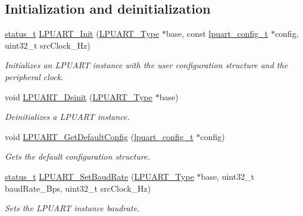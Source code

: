 \subsection*{Initialization and deinitialization}
\begin{DoxyCompactItemize}
\item 
\mbox{\hyperlink{group__ksdk__common_gaaabdaf7ee58ca7269bd4bf24efcde092}{status\+\_\+t}} \mbox{\hyperlink{group__lpuart__driver_ga26ce3e5d63d8dd5d317a83f22af9682c}{L\+P\+U\+A\+R\+T\+\_\+\+Init}} (\mbox{\hyperlink{struct_l_p_u_a_r_t___type}{L\+P\+U\+A\+R\+T\+\_\+\+Type}} $\ast$base, const \mbox{\hyperlink{group__lpuart__driver_ga35757fcc752984cb90dafc2e815c3d05}{lpuart\+\_\+config\+\_\+t}} $\ast$config, uint32\+\_\+t src\+Clock\+\_\+\+Hz)
\begin{DoxyCompactList}\small\item\em Initializes an L\+P\+U\+A\+RT instance with the user configuration structure and the peripheral clock. \end{DoxyCompactList}\item 
void \mbox{\hyperlink{group__lpuart__driver_ga303ff3b77767bafa449d96f1e8c921e0}{L\+P\+U\+A\+R\+T\+\_\+\+Deinit}} (\mbox{\hyperlink{struct_l_p_u_a_r_t___type}{L\+P\+U\+A\+R\+T\+\_\+\+Type}} $\ast$base)
\begin{DoxyCompactList}\small\item\em Deinitializes a L\+P\+U\+A\+RT instance. \end{DoxyCompactList}\item 
void \mbox{\hyperlink{group__lpuart__driver_ga95dfe3c3886692f1fe32023d59708440}{L\+P\+U\+A\+R\+T\+\_\+\+Get\+Default\+Config}} (\mbox{\hyperlink{group__lpuart__driver_ga35757fcc752984cb90dafc2e815c3d05}{lpuart\+\_\+config\+\_\+t}} $\ast$config)
\begin{DoxyCompactList}\small\item\em Gets the default configuration structure. \end{DoxyCompactList}\item 
\mbox{\hyperlink{group__ksdk__common_gaaabdaf7ee58ca7269bd4bf24efcde092}{status\+\_\+t}} \mbox{\hyperlink{group__lpuart__driver_gaf03d9292f8b4cb6e9748cb0bc1db7577}{L\+P\+U\+A\+R\+T\+\_\+\+Set\+Baud\+Rate}} (\mbox{\hyperlink{struct_l_p_u_a_r_t___type}{L\+P\+U\+A\+R\+T\+\_\+\+Type}} $\ast$base, uint32\+\_\+t baud\+Rate\+\_\+\+Bps, uint32\+\_\+t src\+Clock\+\_\+\+Hz)
\begin{DoxyCompactList}\small\item\em Sets the L\+P\+U\+A\+RT instance baudrate. \end{DoxyCompactList}\end{DoxyCompactItemize}
